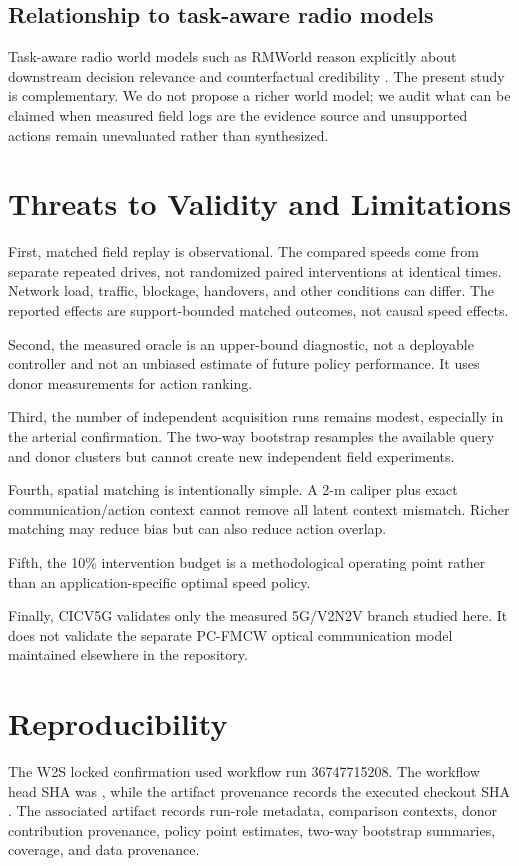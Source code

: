 \documentclass[journal]{IEEEtran}
\begin{document}
\subsection{Relationship to task-aware radio models}
Task-aware radio world models such as RMWorld reason explicitly about downstream decision relevance and counterfactual credibility \cite{wang2026rmworld}. The present study is complementary. We do not propose a richer world model; we audit what can be claimed when measured field logs are the evidence source and unsupported actions remain unevaluated rather than synthesized.

\section{Threats to Validity and Limitations}
First, matched field replay is observational. The compared speeds come from separate repeated drives, not randomized paired interventions at identical times. Network load, traffic, blockage, handovers, and other conditions can differ. The reported effects are support-bounded matched outcomes, not causal speed effects.

Second, the measured oracle is an upper-bound diagnostic, not a deployable controller and not an unbiased estimate of future policy performance. It uses donor measurements for action ranking.

Third, the number of independent acquisition runs remains modest, especially in the arterial confirmation. The two-way bootstrap resamples the available query and donor clusters but cannot create new independent field experiments.

Fourth, spatial matching is intentionally simple. A 2-m caliper plus exact communication/action context cannot remove all latent context mismatch. Richer matching may reduce bias but can also reduce action overlap.

Fifth, the 10\% intervention budget is a methodological operating point rather than an application-specific optimal speed policy.

Finally, CICV5G validates only the measured 5G/V2N2V branch studied here. It does not validate the separate PC-FMCW optical communication model maintained elsewhere in the repository.

\section{Reproducibility}
The W2S locked confirmation used workflow run 36747715208. The workflow head SHA was
, while the artifact provenance records the executed checkout SHA
. The associated artifact records run-role metadata, comparison contexts, donor contribution provenance, policy point estimates, two-way bootstrap summaries, coverage, and data provenance.
\end{document}
